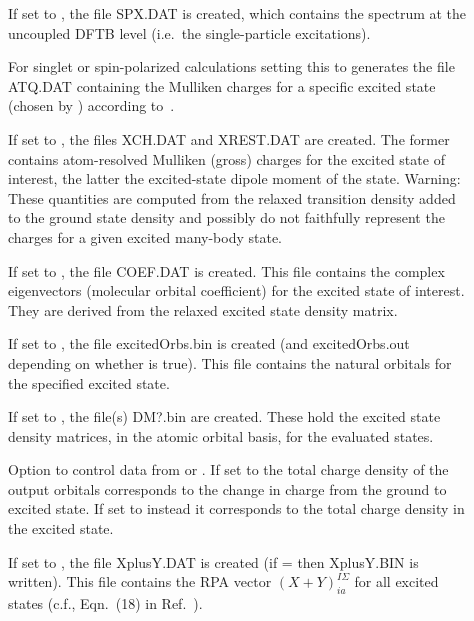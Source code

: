 \begin{description}
  \item[] If set to , the file SPX.DAT is
    created, which contains the spectrum at the uncoupled DFTB level (i.e.\ the
    single-particle excitations).

  \item[] For singlet or spin-polarized
    calculations setting this to  generates the file
    ATQ.DAT containing the Mulliken charges for a specific excited state (chosen by
    ) according to~\cite{plotz2014new}.

  \item[] If set to , the files XCH.DAT and XREST.DAT
    are created. The former contains atom-resolved Mulliken (gross) charges for
    the excited state of interest, the latter the excited-state dipole moment of
    the state. Warning: These quantities are computed from the relaxed
    transition density added to the ground state density and possibly do not
    faithfully represent the charges for a given excited many-body
    state.

  \item[] If set to , the file COEF.DAT is
    created. This file contains the complex eigenvectors (molecular orbital
    coefficient) for the excited state of interest. They are derived from the
    relaxed excited state density matrix.

  \item[] If set to , the file excitedOrbs.bin is
    created (and excitedOrbs.out depending on whether  is
    true). This file contains the natural orbitals for the specified excited
    state.

  \item[] If set to , the file(s) DM?.bin are
    created. These hold the excited state density matrices, in the atomic
    orbital basis, for the evaluated states.

  \item[] Option to control data from
     or . If set to  the
    total charge density of the output orbitals corresponds to the change in
    charge from the ground to excited state. If set to  instead it
    corresponds to the total charge density in the excited state.

  \item[] If set to , the file XplusY.DAT is
    created (if   =  then XplusY.BIN is written).
    This file contains the RPA vector $(X+Y)^{I\Sigma}_{ia}$ for all
    excited states (c.f., Eqn.~(18) in Ref.~\cite{heringer2007aes}).
    

\end{description}
